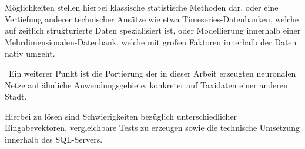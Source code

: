 Möglichkeiten stellen hierbei klassische statistische Methoden dar, oder eine Vertiefung anderer technischer Ansätze wie etwa Timeseries-Datenbanken, welche auf zeitlich strukturierte Daten spezialisiert ist, oder Modellierung innerhalb einer Mehrdimensionalen-Datenbank, welche mit großen Faktoren innerhalb der Daten nativ umgeht.

~\newline Ein weiterer Punkt ist die Portierung der in dieser Arbeit erzeugten neuronalen Netze auf ähnliche Anwendungsgebiete, konkreter auf Taxidaten einer anderen Stadt. 

Hierbei zu lösen sind Schwierigkeiten bezüglich unterschiedlicher Eingabevektoren, vergleichbare Tests zu erzeugen sowie die technische Umsetzung innerhalb des SQL-Servers.  
